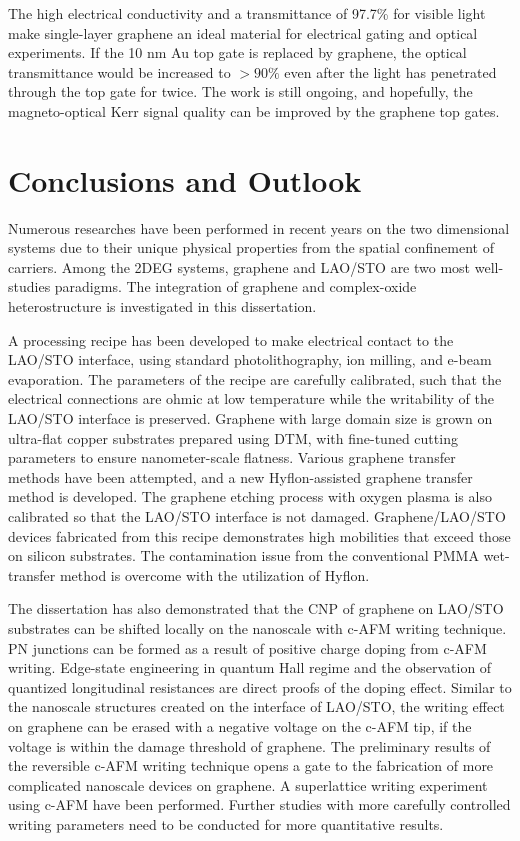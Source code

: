 \documentclass[pdflatex, sectionletters, 12pt]{pittetd}    %
\begin{document}
The high electrical conductivity and a transmittance of 97.7\% for visible light\cite{nair2008fine} make single-layer graphene an ideal material for electrical gating and optical experiments. If the 10 nm Au top gate is replaced by graphene, the optical transmittance would be increased to $> 90\%$ even after the light has penetrated through the top gate for twice. The work is still ongoing, and hopefully, the magneto-optical Kerr signal quality can be improved by the graphene top gates.

\chapter{Conclusions and Outlook}

Numerous researches have been performed in recent years on the two dimensional systems due to their unique physical properties from the spatial confinement of carriers. Among the 2DEG systems, graphene and LAO/STO are two most well-studies paradigms. The integration of graphene and complex-oxide heterostructure is investigated in this dissertation. 

A processing recipe has been developed to make electrical contact to the LAO/STO interface, using standard photolithography, ion milling, and e-beam evaporation. The parameters of the recipe are carefully calibrated, such that the electrical connections are ohmic at low temperature while the writability of the LAO/STO interface is preserved. Graphene with large domain size is grown on ultra-flat copper substrates prepared using DTM, with fine-tuned cutting parameters to ensure nanometer-scale flatness. Various graphene transfer methods have been attempted, and a new Hyflon-assisted graphene transfer method is developed. The graphene etching process with oxygen plasma is also calibrated so that the LAO/STO interface is not damaged. Graphene/LAO/STO devices fabricated from this recipe demonstrates high mobilities that exceed those on silicon substrates. The contamination issue from the conventional PMMA wet-transfer method is overcome with the utilization of Hyflon.

The dissertation has also demonstrated that the CNP of graphene on LAO/STO substrates can be shifted locally on the nanoscale with c-AFM writing technique. PN junctions can be formed as a result of positive charge doping from c-AFM writing. Edge-state engineering in quantum Hall regime and the observation of quantized longitudinal resistances are direct proofs of the doping effect. Similar to the nanoscale structures created on the interface of LAO/STO, the writing effect on graphene can be erased with a negative voltage on the c-AFM tip, if the voltage is within the damage threshold of graphene. The preliminary results of the reversible c-AFM writing technique opens a gate to the fabrication of more complicated nanoscale devices on graphene. A superlattice writing experiment using c-AFM have been performed. Further studies with more carefully controlled writing parameters need to be conducted for more quantitative results.
\end{document}
